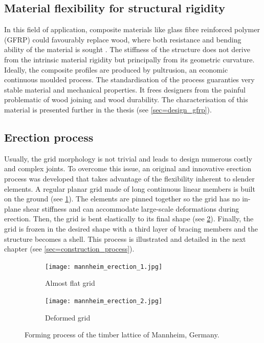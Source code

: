 \subsection{Material flexibility for structural rigidity}\label{sec=def_flexibility}
In this field of application, composite materials like glass fibre reinforced polymer (GFRP) could favourably replace wood, where both resistance and bending ability of the material is sought \cite{Douthe2010a}. The stiffness of the structure does not derive from the intrinsic material rigidity but principally from its geometric curvature. Ideally, the composite profiles are produced by pultrusion, an economic continuous moulded process. The standardisation of the process guaranties very stable material and mechanical properties. It frees designers from the painful problematic of wood joining and wood durability. The characterisation of this material is presented further in the thesis (see \cref{sec=design_gfrp}).

\subsection{Erection process}\label{sec=def_erec}
Usually, the grid morphology is not trivial and leads to design numerous costly and complex joints. To overcome this issue, an original and innovative erection process was developed that takes advantage of the flexibility inherent to slender elements. A regular planar grid made of long continuous linear members is built on the ground (see \cref{fig:erec_1}). The elements are pinned together so the grid has no in-plane shear stiffness and can accommodate large-scale deformations during erection. Then, the grid is bent elastically to its final shape (see \cref{fig:erec_2}). Finally, the grid is frozen in the desired shape with a third layer of bracing members and the structure becomes a shell. This process is illustrated and detailed in the next chapter (see \cref{sec=construction_process}).

\begin{figure}[t]
	\begin{subfigure}[b]{\TwoMediaWidth}
		\texttt{[image: mannheim\_erection\_1.jpg]}
		\caption{Almost flat grid}
		\label{fig:erec_1}
	\end{subfigure}%
	\hspace{\MediaGutterWidth}%
	\begin{subfigure}[b]{\TwoMediaWidth}
		\texttt{[image: mannheim\_erection\_2.jpg]}
		\caption{Deformed grid}
		\label{fig:erec_2}
	\end{subfigure}
	\caption[Forming process of the timber lattice of Mannheim, Germany]{Forming process of the timber lattice of Mannheim, Germany.}
	\label{fig:multihalle}
\end{figure}


